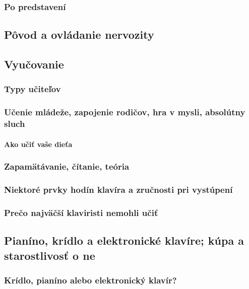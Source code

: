 \subsubsection{Po predstavení}

\subsection{Pôvod a ovládanie nervozity}

\subsection{Vyučovanie}

\subsubsection{Typy učiteľov}

\subsubsection{Učenie mládeže, zapojenie rodičov, hra v mysli, absolútny sluch}

\paragraph{Ako učiť vaše dieťa}

\subsubsection{Zapamätávanie, čítanie, teória}

\subsubsection{Niektoré prvky hodín klavíra a zručnosti pri vystúpení}

\subsubsection{Prečo najväčší klaviristi nemohli učiť}

\subsection{Pianíno, krídlo a elektronické klavíre; kúpa a starostlivosť o ne}

\subsubsection{Krídlo, pianíno alebo elektronický klavír?}

